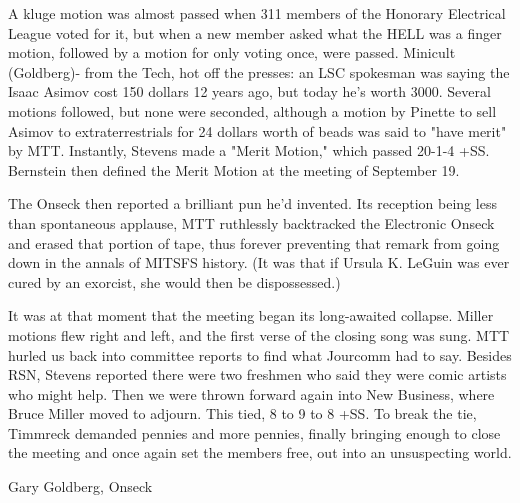 \documentclass[12pt]{article}
\begin{document}
A kluge motion was almost passed when 311 members of the Honorary Electrical League voted for it, but when a new member asked what the HELL was a finger motion, followed by a motion for only voting once, were passed. Minicult (Goldberg)- from the Tech, hot off the presses: an LSC spokesman was saying the Isaac Asimov cost 150 dollars 12 years ago, but today he's worth 3000. Several motions followed, but none were seconded, although a motion by Pinette to sell Asimov to extraterrestrials for 24 dollars worth of beads was said to "have merit" by MTT. Instantly, Stevens made a "Merit Motion," which passed 20-1-4 +SS. Bernstein then defined the Merit Motion at the meeting of September 19.

The Onseck then reported a brilliant pun he'd invented. Its reception being less than spontaneous applause, MTT ruthlessly backtracked the Electronic Onseck and erased that portion of tape, thus forever preventing that remark from going down in the annals of MITSFS history. (It was that if Ursula K. LeGuin was ever cured by an exorcist, she would then be dispossessed.)

It was at that moment that the meeting began its long-awaited collapse. Miller motions flew right and left, and the first verse of the closing song was sung. MTT hurled us back into committee reports to find what Jourcomm had to say. Besides RSN, Stevens reported there were two freshmen who said they were comic artists who might help. Then we were thrown forward again into New Business, where Bruce Miller moved to adjourn. This tied, 8 to 9 to 8 +SS. To break the tie, Timmreck demanded pennies and more pennies, finally bringing enough to close the meeting and once again set the members free, out into an unsuspecting world.

\vspace{12pt}

\centerline{Gary Goldberg, Onseck}
\end{document}
